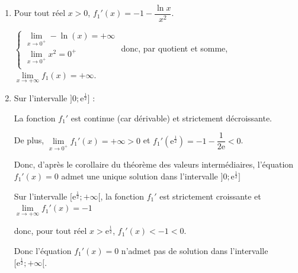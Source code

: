 \documentclass[10pt]{article}
\providecommand{\e}{{\mathrm{e}}}
\begin{document}
\begin{enumerate}
\begin{enumerate}
			De plus $\begin{aligned}[t] f_1'\left( \e^{\frac{1}{2}}\right) & =- 1-  \dfrac{ \ln \left( \e^{\frac{1}{2}}\right)  }{ \left(\e^{\frac{1}{2}}\right)^2 }\\
			& = -1- \dfrac{ \frac{1}{2} }{ \e^1}\\
		   & = -1- \dfrac{ 1 }{ 2 \e}
		   	\end{aligned}$
	
		
		On a donc : 
	
		\hfill~
	\hfill~
		
		
		
		
		
		\item   Pour tout réel $x>0$, \quad $f_{1}'(x)= -1-\dfrac{\ln x}{x^2}$. 
		
		
		$\begin{cases}
			\lim\limits_{x\to 0^+} - \ln(x)= +\infty \\
			\lim\limits_{x\to 0^+ } {x^2}= 0^+ \\
		\end{cases}$ donc, par quotient et somme, $\lim\limits_{x \to +\infty } f_1(x)= + \infty$.  
		
		
		
		
		\item  Sur l'intervalle $\Big]0 ; \e^{\frac{1}{2}}\Big]$ :
		
		La fonction $f_1'$ est continue (car dérivable) et  strictement décroissante.
		
		De plus, $\lim\limits_{x\to 0^+ } f_1'(x) = +\infty >0 $ et $f_1'\left(\e^{\frac{1}{2}}\right) = -1 -\dfrac{1}{2\e}<0$.
		
		Donc, d'après le corollaire du théorème des valeurs intermédiaires, l'équation $f_1'(x) = 0$ admet une unique solution dans l'intervalle $\Big]0 ; \e^{\frac{1}{2}}\Big]$
		
		
		Sur l'intervalle $\Big[ \e^{\frac{1}{2}}; +\infty \Big[$, la fonction $f_1'$ est strictement croissante et $\lim\limits_{x \to +\infty} f_1'(x) =-1$ 
		
		donc, pour tout réel $x > \e^{\frac{1}{2}}$, \quad $f_1'(x) <-1 <0$. 
		
		Donc l'équation $f_1'(x) = 0$ n'admet pas de solution dans l'intervalle $\Big[ \e^{\frac{1}{2}}; +\infty \Big[$. 
		

\end{enumerate}
\end{enumerate}
\end{document}
